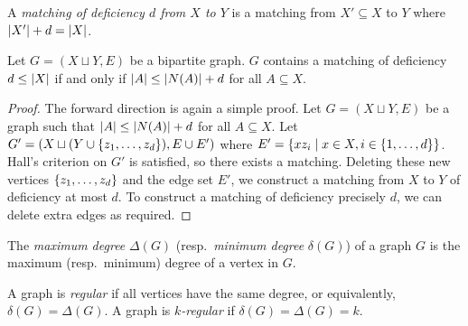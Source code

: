 \begin{definition}
	A \emph{matching of deficiency \( d \) from \( X \) to \( Y \)} is a matching from \( X' \subseteq X \) to \( Y \) where \( \abs{X'} + d = \abs{X} \).
\end{definition}
\begin{theorem}
	Let \( G = (X \sqcup Y, E) \) be a bipartite graph.
	\( G \) contains a matching of deficiency \( d \leq \abs{X} \) if and only if \( \abs{A} \leq \abs{N(A)} + d \) for all \( A \subseteq X \).
\end{theorem}
\begin{proof}
	The forward direction is again a simple proof.
	Let \( G = (X \sqcup Y, E) \) be a graph such that \( \abs{A} \leq \abs{N(A)} + d \) for all \( A \subseteq X \).
	Let \( G' = (X \sqcup (Y \cup \qty{z_1, \dots, z_d}), E \cup E') \) where \( E' = \qty{xz_i \mid x \in X, i \in \qty{1, \dots, d}} \).
	Hall's criterion on \( G' \) is satisfied, so there exists a matching.
	Deleting these new vertices \( \qty{z_1, \dots, z_d} \) and the edge set \( E' \), we construct a matching from \( X \) to \( Y \) of deficiency at most \( d \).
	To construct a matching of deficiency precisely \( d \), we can delete extra edges as required.
\end{proof}
\begin{definition}
	The \emph{maximum degree} \( \Delta(G) \) (resp.\ \emph{minimum degree} \( \delta(G) \)) of a graph \( G \) is the maximum (resp.\ minimum) degree of a vertex in \( G \).
\end{definition}
\begin{definition}
	A graph is \emph{regular} if all vertices have the same degree, or equivalently, \( \delta(G) = \Delta(G) \).
	A graph is \emph{\( k \)-regular} if \( \delta(G) = \Delta(G) = k \).
\end{definition}
